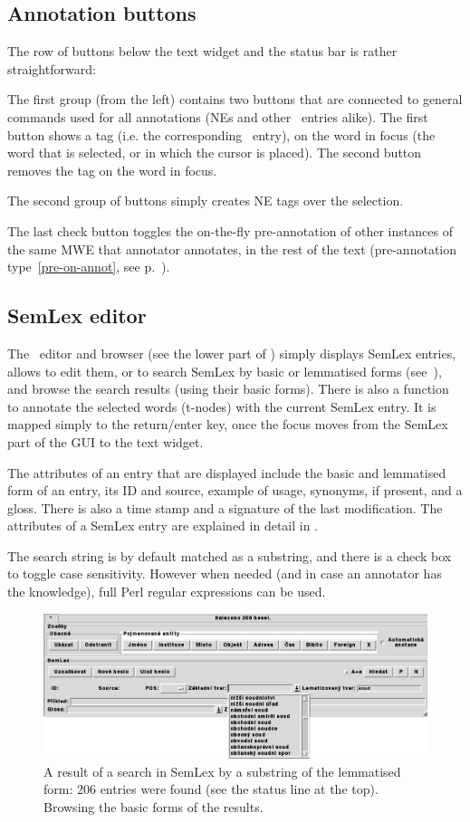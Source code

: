 \subsection{Annotation buttons}
The row of buttons below the text widget and the status bar is rather straightforward: 

The first group (from the left) contains two buttons that are connected to general commands used for all annotations (NEs and other \semlex\ entries alike). The first button shows a tag (i.e. the corresponding \semlex\ entry), on the word in focus (the word that is selected, or in which the cursor is placed). The second button removes the tag on the word in focus.

The second group of buttons simply creates NE tags over the selection. 

The last check button toggles the on-the-fly pre-annotation of other instances of the same MWE that annotator annotates, in the rest of the text (pre-annotation type~\ref{pre-on-annot}, see p.~\pageref{pre-on-annot}).



\subsection{SemLex editor}
The \semlex\ editor and browser (see the lower part of ) simply displays SemLex entries, allows to edit them, or to search SemLex by basic or lemmatised forms (see~), and browse the search results (using their basic forms). There is also a function to annotate the selected words (t-nodes) with the current SemLex entry. It is mapped simply to the return/enter key, once the focus moves from the SemLex part of the GUI to the text widget.

The attributes of an entry that are displayed include the basic and lemmatised form of an entry, its ID and source, example of usage, synonyms, if present, and a gloss. There is also a time stamp and a signature of the last modification. The attributes of a SemLex entry are explained in detail in .

The search string is by default matched as a substring, and there is a check box to toggle case sensitivity. However when needed (and in case an annotator has the knowledge), full Perl regular expressions can be used. 
\begin{figure}[htbp]
   \centering
   \includegraphics[width=\textwidth]{images/semlex-search}
   \caption{A result of a search in SemLex by a substring of the lemmatised form: 206 entries were found (see the status line at the top). Browsing the basic forms of the results.}
   \label{fig:semlex-search}
\end{figure}

